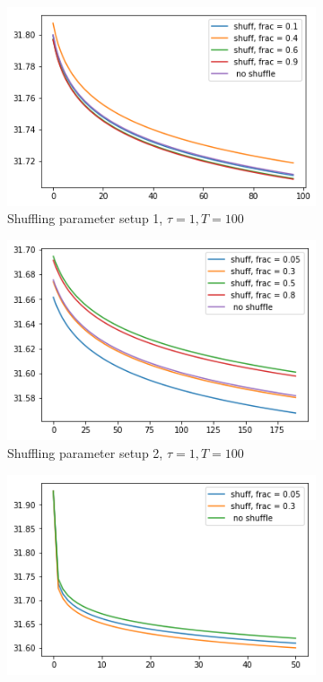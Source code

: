 \documentclass[11pt, fullpage,letterpaper]{article}
\begin{document}
\begin{enumerate}
\begin{figure}
\centering
\begin{subfigure}{.5\textwidth}
  \centering
  \includegraphics[width=\linewidth]{figure_1}
  \caption{Shuffling parameter setup 1, $\tau =1, T=100$}
  \label{fig_11}
\end{subfigure}%
\begin{subfigure}{.5\textwidth}
  \centering
  \includegraphics[width=\linewidth]{figure_2}
 \caption{Shuffling parameter setup 2, $\tau =1, T=100$}
 \label{fig_12}
\end{subfigure}
\begin{subfigure}{.5\textwidth}
  \centering
  \includegraphics[width=\linewidth]{figure_3_tao2}

\end{subfigure}
\end{figure}
\end{enumerate}
\end{document}
